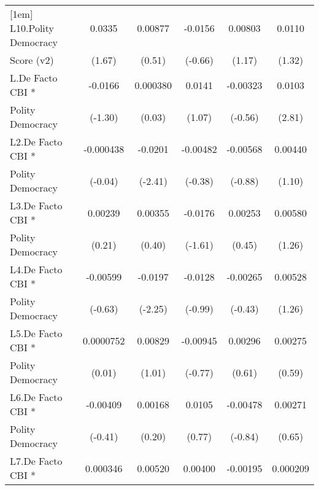 {\begin{tabular}{l*{5}{c}}
[1em]
L10.Polity Democracy&      0.0335         &     0.00877         &     -0.0156         &     0.00803         &      0.0110         \\
Score (v2)          &      (1.67)         &      (0.51)         &     (-0.66)         &      (1.17)         &      (1.32)         \\
[1em]
L.De Facto CBI *    &     -0.0166         &    0.000380         &      0.0141         &    -0.00323         &      0.0103\sym{**} \\
Polity Democracy    &     (-1.30)         &      (0.03)         &      (1.07)         &     (-0.56)         &      (2.81)         \\
[1em]
L2.De Facto CBI *   &   -0.000438         &     -0.0201\sym{*}  &    -0.00482         &    -0.00568         &     0.00440         \\
Polity Democracy    &     (-0.04)         &     (-2.41)         &     (-0.38)         &     (-0.88)         &      (1.10)         \\
[1em]
L3.De Facto CBI *   &     0.00239         &     0.00355         &     -0.0176         &     0.00253         &     0.00580         \\
Polity Democracy    &      (0.21)         &      (0.40)         &     (-1.61)         &      (0.45)         &      (1.26)         \\
[1em]
L4.De Facto CBI *   &    -0.00599         &     -0.0197\sym{*}  &     -0.0128         &    -0.00265         &     0.00528         \\
Polity Democracy    &     (-0.63)         &     (-2.25)         &     (-0.99)         &     (-0.43)         &      (1.26)         \\
[1em]
L5.De Facto CBI *   &   0.0000752         &     0.00829         &    -0.00945         &     0.00296         &     0.00275         \\
Polity Democracy    &      (0.01)         &      (1.01)         &     (-0.77)         &      (0.61)         &      (0.59)         \\
[1em]
L6.De Facto CBI *   &    -0.00409         &     0.00168         &      0.0105         &    -0.00478         &     0.00271         \\
Polity Democracy    &     (-0.41)         &      (0.20)         &      (0.77)         &     (-0.84)         &      (0.65)         \\
[1em]
L7.De Facto CBI *   &    0.000346         &     0.00520         &     0.00400         &    -0.00195         &    0.000209         \\

\end{tabular}}
